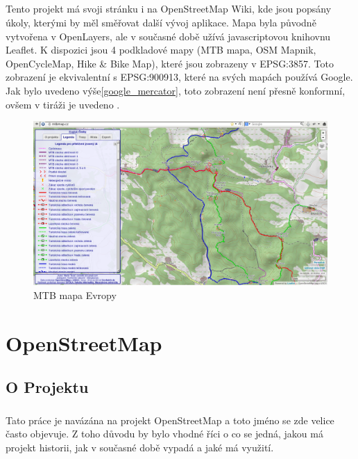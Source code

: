 \documentclass[11pt,a4paper,titlepage,oneside]{book}
\begin{document}
		\paragraph{} Tento projekt má svoji stránku i na OpenStreetMap Wiki, kde jsou popsány úkoly, kterými by měl směřovat další vývoj aplikace. Mapa byla původně vytvořena v OpenLayers\cite{tesar_bp}, ale v současné době užívá javascriptovou knihovnu Leaflet. K dispozici jsou 4 podkladové mapy (MTB mapa, OSM Mapnik, OpenCycleMap, Hike \& Bike Map), které jsou zobrazeny v EPSG:3857. Toto zobrazení je ekvivalentní s EPSG:900913, které na svých mapách používá Google. Jak bylo uvedeno výše\ref{google_mercator}, toto zobrazení není přesně konformní, ovšem v tiráži je uvedeno .
		\begin{figure}[!h]
			\begin{center}
				\includegraphics[width=12cm]{obrazky/mtb.png}
				\caption{MTB mapa Evropy}
			\end{center}
		\end{figure}

\chapter{OpenStreetMap}
	\section{O Projektu}
		\paragraph{} Tato práce je navázána na projekt OpenStreetMap a toto jméno se zde velice často objevuje. Z toho důvodu by bylo vhodné říci o co se jedná, jakou má projekt historii, jak v současné době vypadá a jaké má využití. 
\end{document}
